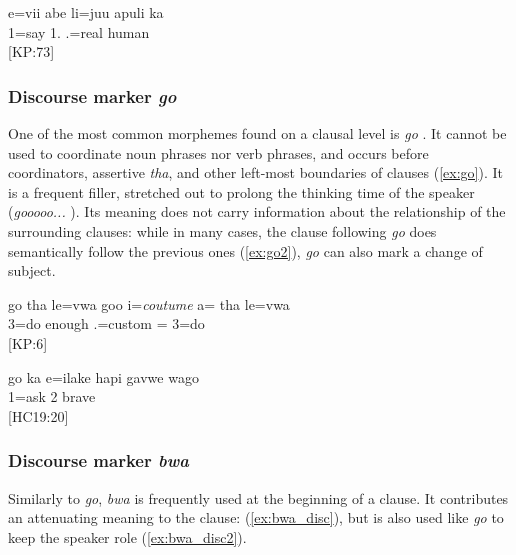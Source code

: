 	\ea
	\gll e=vii abe li=juu apuli ka\\ 
	 1=say 1. .=real human \\ 
	\glt {} {[KP:73]}
		\z


\subsubsection{Discourse marker \textit{go}}
\label{ssec:discourse go}

One of the most common morphemes found on a clausal level is \textit{go} . It cannot be used to coordinate noun phrases nor verb phrases, and occurs before coordinators, assertive \textit{tha}, and other left-most boundaries of clauses (\ref{ex:go}). It is a frequent filler, stretched out to prolong the thinking time of the speaker (\textit{gooooo...} ). Its meaning does not carry information about the relationship of the surrounding clauses: while in many cases, the clause following \textit{go}  does semantically follow the previous ones (\ref{ex:go2}), \textit{go}  can also mark a change of subject.


\ea\label{ex:go}
\gll go tha le=vwa goo i=\textit{coutume} a= tha le=vwa \\ 
   3=do enough .=custom =  3=do\\ 
\glt {} {[KP:6]}
\z


\ea\label{ex:go2}
\gll go ka e=ilake hapi gavwe wago\\ 
   1=ask  2 brave \\ 
\glt {} {[HC19:20]}
\z

\subsubsection{Discourse marker \textit{bwa}}
\label{sec:bwa_disc}

Similarly to \textit{go}, \textit{bwa} is frequently used at the beginning of a clause. It contributes an attenuating meaning to the clause:  (\ref{ex:bwa_disc}), but is also used like \textit{go} to keep the speaker role (\ref{ex:bwa_disc2}).


